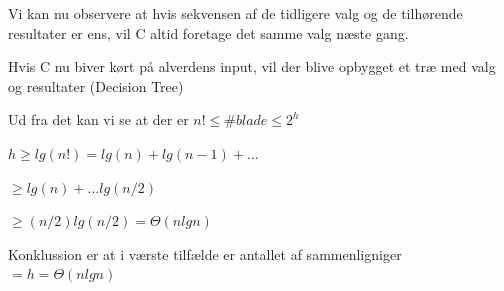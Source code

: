 \documentclass[]{article}
\begin{document}
{Vi kan nu observere at hvis sekvensen af de tidligere valg og de tilhørende resultater er ens, vil C altid foretage det samme valg næste gang.

Hvis C nu biver kørt på alverdens input, vil der blive opbygget et træ med valg og resultater (Decision Tree)

Ud fra det kan vi se at der er $n! \le \# blade \le 2^h $

$h \ge lg(n!) = lg(n) + lg(n-1) + \dots $

$\ge lg(n) + \dots lg(n/2)$

$\ge (n/2) lg(n/2) = \Theta (nlgn)$

Konklussion er at i værste tilfælde er antallet af sammenligniger $= h = \Theta(nlgn)$
}
\end{document}

